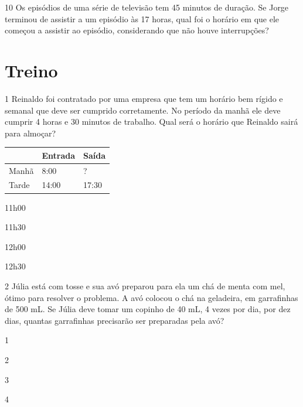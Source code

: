 \num{10} Os episódios de uma série de televisão tem 45 minutos de duração.
Se Jorge terminou de assistir a um episódio às 17 horas, qual foi o
horário em que ele começou a assistir ao episódio, considerando que não houve interrupções?

\section*{Treino}

\num{1} Reinaldo foi contratado por uma empresa que tem um horário bem rígido
e semanal que deve ser cumprido corretamente. No período da manhã ele deve
cumprir 4 horas e 30 minutos de trabalho. Qual será o horário que
Reinaldo sairá para almoçar?


\begin{longtable}[]{@{}lll@{}}
\toprule
& Entrada & Saída\tabularnewline
\midrule
\endhead
Manhã & 8:00 & ?\tabularnewline
Tarde & 14:00 & 17:30\tabularnewline
\bottomrule
\end{longtable}

\begin{escolha}
\item
  11h00
\item
  11h30
\item
  12h00
\item
  12h30
\end{escolha}


\num{2} Júlia está com tosse e sua avó preparou para ela um chá de menta com mel, ótimo para resolver o problema. A avó colocou o chá na geladeira, em garrafinhas de 500 mL. Se Júlia deve tomar um copinho de 40 mL, 4 vezes por dia, por dez dias, quantas garrafinhas precisarão ser preparadas pela avó?

\begin{escolha}

\item
  1
\item
  2
\item
  3
\item
  4
\end{escolha}

